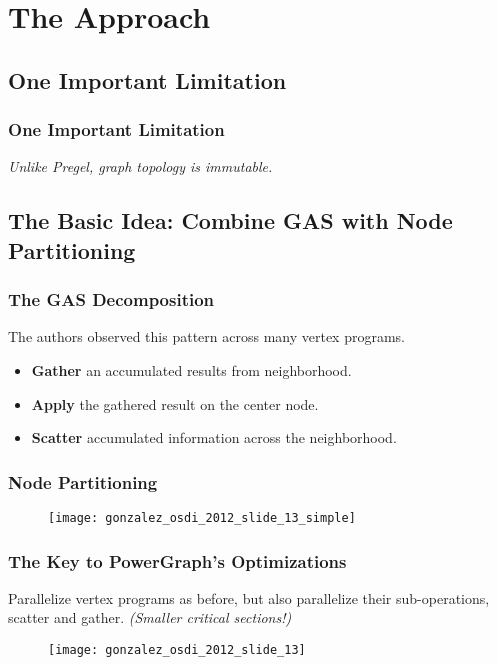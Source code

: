 \section{The Approach}

\subsection{One Important Limitation}

\begin{frame}
  \frametitle{One Important Limitation}
  \centering
  \Large \textit{Unlike Pregel, graph topology is immutable.}
\end{frame}


\subsection{The Basic Idea: Combine GAS with Node Partitioning}

\begin{frame}
  \frametitle{The GAS Decomposition}
  The authors observed this pattern across many vertex programs.
  \begin{itemize}
    \item \textbf{Gather} an accumulated results from neighborhood.
    \item \textbf{Apply} the gathered result on the center node.
    \item \textbf{Scatter} accumulated information across the neighborhood.
  \end{itemize}
\end{frame}

\begin{frame}
  \frametitle{Node Partitioning}
  \begin{figure}
    \centering
    \texttt{[image: gonzalez\_osdi\_2012\_slide\_13\_simple]}
    \caption{\cite[OSDI '12 Slides]{gonzalez2012powergraph-slides}}
  \end{figure}
\end{frame}

\begin{frame}
  \frametitle{The Key to PowerGraph's Optimizations}
  \centering
  Parallelize vertex programs as before, but also parallelize their
  sub-operations, scatter and gather. \textit{(Smaller critical sections!)}

  \begin{figure}
    \centering
    \texttt{[image: gonzalez\_osdi\_2012\_slide\_13]}
    \caption{\cite[OSDI '12 Slides]{gonzalez2012powergraph-slides}}
  \end{figure}
\end{frame}


